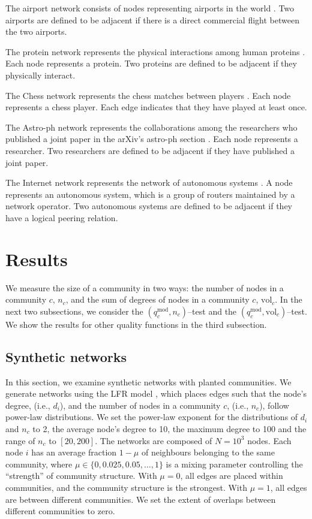 \documentclass[fleqn,10pt]{wlscirep}
\def\qmod{q^{\text{mod}}}
\def\vol{\text{vol}}
\begin{document}
The airport network consists of nodes representing airports in the world \cite{Openflight.org,ToreOpsahl}.
Two airports are defined to be adjacent if there is a direct commercial flight between the two airports.

The protein network represents the physical interactions among human proteins \cite{Rual2005,Vidal}.
Each node represents a protein. 
Two proteins are defined to be adjacent if they physically interact.  

The Chess network represents the chess matches between players \cite{KONECT}.  
Each node represents a chess player. 
Each edge indicates that they have played at least once. 
 
The Astro-ph network represents the collaborations among the researchers who published a joint paper in the arXiv's astro-ph section  \cite{Leskovec2007}.
Each node represents a researcher. 
Two researchers are defined to be adjacent if they have published a joint paper.

The Internet network represents the network of autonomous systems \cite{KONECT}.
A node represents an autonomous system, which is a group of routers maintained by a network operator. 
Two autonomous systems are defined to be adjacent if they have a logical peering relation.


\section{Results}
We measure the size of a community in two ways: the number of nodes in a community $c$, $n_c$, and the sum of degrees of nodes in a community $c$, $\vol_c$.
In the next two subsections, we consider the $(\qmod_c, n_c)$--test and the $(\qmod_c, \vol_c)$--test.
We show the results for other quality functions in the third subsection. 


\subsection{Synthetic networks}
\label{sec:synthetic_networks}
In this section, we examine synthetic networks with planted communities.
We generate networks using the LFR model \cite{Lancichinetti2008}, which places edges such that the node's degree, (i.e., $d_i$), and the number of nodes in a community $c$, (i.e., $n_c$), follow power-law distributions.
We set the power-law exponent for the distributions of $d_i$ and $n_c$ to 2, the average node's degree to 10, the maximum degree to 100 and the range of $n_c$ to $[20, 200]$. 
The networks are composed of $N=10^3$ nodes. 
Each node $i$ has an average fraction $1-\mu$ of neighbours belonging to the same community, where $\mu \in \{0, 0.025, 0.05, \ldots, 1\}$ is a mixing parameter controlling the ``strength'' of community structure. 
With $\mu=0$, all edges are placed within communities, and the community structure is the strongest.
With $\mu=1$, all edges are between different communities. 
We set the extent of overlaps between different communities to zero.
\end{document}
